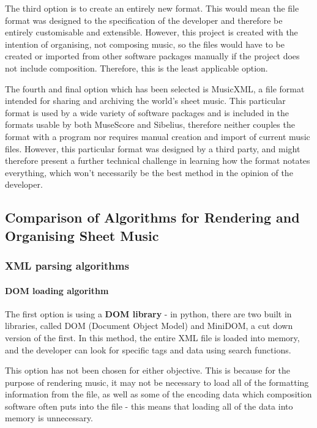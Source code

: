 The third option is to create an entirely new format. This would mean the file format was designed to the specification of the developer and therefore be entirely customisable and extensible. However, this project is created with the intention of organising, not composing music, so the files would have to be created or imported from other software packages manually if the project does not include composition. Therefore, this is the least applicable option.

The fourth and final option which has been selected is MusicXML, a file format intended for sharing and archiving the world's sheet music\parencite{mxml}. This particular format is used by a wide variety of software packages\parencite{mxml} and is included in the formats usable by both MuseScore\parencite{MuseTour} and Sibelius\parencite{avid}, therefore neither couples the format with a program nor requires manual creation and import of current music files. However, this particular format was designed by a third party, and might therefore present a further technical challenge in learning how the format notates everything, which won't necessarily be the best method in the opinion of the developer.

\subsection{Comparison of Algorithms for Rendering and Organising Sheet Music}
\subsubsection{XML parsing algorithms}
\paragraph{DOM loading algorithm}
The first option is using a \textbf{DOM library} - in python, there are two built in libraries, called DOM (Document Object Model) and MiniDOM, a cut down version of the first. In this method, the entire XML file is loaded into memory, and the developer can look for specific tags and data using search functions.

This option has not been chosen for either objective. This is because for the purpose of rendering music, it may not be necessary to load all of the formatting information from the file, as well as some of the encoding data which composition software often puts into the file - this means that loading all of the data into memory is unnecessary. 

